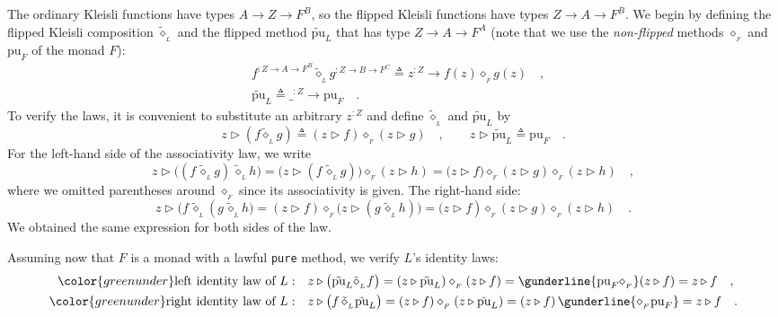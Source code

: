 The ordinary Kleisli functions have types $A\rightarrow Z\rightarrow F^{B}$,
so the flipped Kleisli functions have types $Z\rightarrow A\rightarrow F^{B}$.
We begin by defining the flipped Kleisli composition $\tilde{\diamond}_{_{L}}$
and the flipped method $\tilde{\text{pu}}_{L}$ that has type $Z\rightarrow A\rightarrow F^{A}$
(note that we use the \emph{non-flipped} methods $\diamond_{_{F}}$
and $\text{pu}_{F}$ of the monad $F$):
\begin{align*}
 & f^{:Z\rightarrow A\rightarrow F^{B}}\tilde{\diamond}_{_{L}}g^{:Z\rightarrow B\rightarrow F^{C}}\triangleq z^{:Z}\rightarrow f(z)\diamond_{_{F}}g(z)\quad,\\
 & \tilde{\text{pu}}_{L}\triangleq\_^{:Z}\rightarrow\text{pu}_{F}\quad.
\end{align*}
To verify the laws, it is convenient to substitute an arbitrary $z^{:Z}$
and define $\tilde{\diamond}_{_{L}}$ and $\tilde{\text{pu}}_{L}$
by
\[
z\triangleright(f\tilde{\diamond}_{_{L}}g)\triangleq(z\triangleright f)\diamond_{_{F}}(z\triangleright g)\quad,\quad\quad z\triangleright\tilde{\text{pu}}_{L}\triangleq\text{pu}_{F}\quad.
\]
For the left-hand side of the associativity law, we write
\[
z\triangleright\big((f\,\tilde{\diamond}_{_{L}}g)\,\tilde{\diamond}_{_{L}}h\big)=\big(z\triangleright(f\,\tilde{\diamond}_{_{L}}g)\big)\diamond_{_{F}}(z\triangleright h)=\big(z\triangleright f)\diamond_{_{F}}(z\triangleright g)\diamond_{_{F}}(z\triangleright h)\quad,
\]
where we omitted parentheses around $\diamond_{_{F}}$ since its associativity
is given. The right-hand side:
\[
z\triangleright\big(f\,\tilde{\diamond}_{_{L}}(g\,\tilde{\diamond}_{_{L}}h\big)=(z\triangleright f)\diamond_{_{F}}\big(z\triangleright(g\,\tilde{\diamond}_{_{L}}h)\big)=\big(z\triangleright f)\diamond_{_{F}}(z\triangleright g)\diamond_{_{F}}(z\triangleright h)\quad.
\]
We obtained the same expression for both sides of the law.

Assuming now that $F$ is a monad with a lawful \lstinline!pure!
method, we verify $L$\textsf{'}s identity laws:
\begin{align*}
{\color{greenunder}\text{left identity law of }L:}\quad & z\triangleright\big(\tilde{\text{pu}}_{L}\tilde{\diamond}_{_{L}}f\big)=(z\triangleright\tilde{\text{pu}}_{L})\diamond_{_{F}}(z\triangleright f)=\gunderline{\text{pu}_{F}\diamond_{_{F}}}(z\triangleright f)=z\triangleright f\quad,\\
{\color{greenunder}\text{right identity law of }L:}\quad & z\triangleright\big(f\,\tilde{\diamond}_{_{L}}\tilde{\text{pu}}_{L}\big)=(z\triangleright f)\diamond_{_{F}}(z\triangleright\tilde{\text{pu}}_{L})=(z\triangleright f)\,\gunderline{\diamond_{_{F}}\text{pu}_{F}}=z\triangleright f\quad.
\end{align*}

